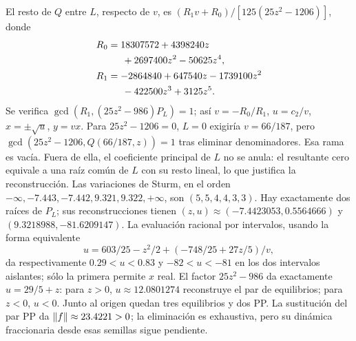 El resto de $Q$ entre $L$, respecto de $v$, es
$(R_1v+R_0)/[125(25z^2-1206)]$, donde
\begin{equation}
 \begin{aligned}
 R_0&=18307572+4398240z\\
    &\hspace{1.5em}+2697400z^2-50625z^4,\\
 R_1&=-2864840+647540z-1739100z^2\\
    &\hspace{1.5em}-422500z^3+3125z^5.
 \end{aligned}
 \label{bre:geo:lorenz-remainder}
\end{equation}
Se verifica $\gcd(R_1,(25z^2-986)P_L)=1$; así $v=-R_0/R_1$,
$u=c_2/v$, $x=\pm\sqrt u$, $y=vx$. Para $25z^2-1206=0$,
$L=0$ exigiría $v=66/187$, pero
$\gcd(25z^2-1206,Q(66/187,z))=1$ tras eliminar denominadores.
Esa rama es vacía. Fuera de ella, el coeficiente principal de $L$ no
se anula: el resultante cero equivale a una raíz común de $L$ con
su resto lineal, lo que justifica la reconstrucción. Las variaciones de Sturm,
en el orden $-\infty,-7.443,-7.442,9.321,9.322,+\infty$, son
$(5,5,4,4,3,3)$. Hay exactamente dos raíces de $P_L$; sus
reconstrucciones tienen $(z,u)\approx(-7.4423053,0.5564666)$ y
$(9.3218988,-81.6209147)$. La evaluación racional por intervalos, usando
la forma equivalente
\begin{equation}
 u=603/25-z^2/2+(-748/25+27z/5)/v,
 \label{bre:geo:lorenz-sign}
\end{equation}
da respectivamente $0.29<u<0.83$ y $-82<u<-81$ en los dos intervalos
aislantes; sólo la primera permite $x$ real.
El factor $25z^2-986$ da exactamente $u=29/5+z$:
para $z>0$, $u\approx12.0801274$ reconstruye el par de equilibrios;
para $z<0$, $u<0$. Junto al origen quedan tres
equilibrios y dos PP. La sustitución del par PP da
$\left\lVert f\right\rVert\approx23.4221>0$; la eliminación es exhaustiva, pero su
dinámica fraccionaria desde esas semillas sigue pendiente.


